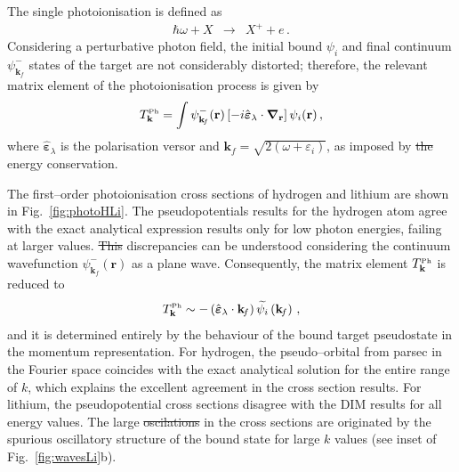 \documentclass[10pt]{article}
\providecommand{\DIFaddtex}[1]{{\protect\color{blue}\uwave{#1}}} %
\providecommand{\DIFdeltex}[1]{{\protect\color{red}\sout{#1}}}                      %
\providecommand{\DIFaddbegin}{} %
\providecommand{\DIFaddend}{} %
\providecommand{\DIFdelbegin}{} %
\providecommand{\DIFdelend}{} %
\providecommand{\DIFadd}[1]{\texorpdfstring{\DIFaddtex{#1}}{#1}} %
\providecommand{\DIFdel}[1]{\texorpdfstring{\DIFdeltex{#1}}{}} %
\begin{document}
The single photoionisation is defined as
\begin{eqnarray}
 \hbar\omega + X &\rightarrow& X^+ + e\,.
\end{eqnarray}
Considering a perturbative photon field, the initial bound $\psi_{i}$ 
and final continuum $\psi_{\mathbf{k}_{\!f}}^-$ states of the target are
not considerably distorted; therefore, the relevant matrix element of the 
photoionisation process is given by
\begin{equation}
 T_{\mathbf{k}}^{\mbox{\tiny Ph}} = \int{
 \psi_{\mathbf{k}_{\!f}}^-(\mathbf{r}) 
 \left[-i \hat{\boldsymbol{\varepsilon}}_\lambda \cdot 
 \boldsymbol{\nabla}_\mathbf{r}\right] 
 \psi_{i}(\mathbf{r})}\,,
\end{equation}
where $\hat{\boldsymbol{\varepsilon}}_\lambda$ is the polarisation 
versor and $\mathbf{k}_{\!f}=\sqrt{2(\omega+\varepsilon_i)}$, as imposed 
by \DIFdelbegin \DIFdel{the }\DIFdelend energy conservation.

The first--order photoionisation cross sections of hydrogen and 
lithium are shown in Fig.~\ref{fig:photoHLi}. The pseudopotentials 
results for the hydrogen atom agree with the exact analytical 
expression results only for low photon energies, failing at larger values. 
\DIFdelbegin \DIFdel{This }\DIFdelend \DIFaddbegin \DIFadd{These }\DIFaddend discrepancies can be understood considering the continuum 
wavefunction $\psi_{\mathbf{k}_{\!f}}^-(\mathbf{r})$ as a plane wave. 
Consequently, the matrix element $T_{\mathbf{k}}^{\mbox{\tiny Ph}}$ 
is reduced to
\begin{equation}
 T_{\mathbf{k}}^{\mbox{\tiny Ph}} \sim 
 -\left(\hat{\boldsymbol{\varepsilon}}_\lambda \cdot \mathbf{k}_{\!f} \right)
 \widetilde{\psi_i} \left(\mathbf{k}_{\!f}\right)\,,
\end{equation}
and it is determined entirely by the behaviour of the bound target 
pseudostate in the momentum representation. For hydrogen, the 
pseudo--orbital from {\sc parsec} in the Fourier space coincides with 
the exact 
analytical solution for the entire range of $k$, which explains the 
excellent agreement in the cross section results.
For lithium, the pseudopotential cross sections disagree with the DIM 
results for all energy values. The large \DIFdelbegin \DIFdel{oscilations }\DIFdelend \DIFaddbegin \DIFadd{oscillations }\DIFaddend in the cross sections
are originated by the spurious oscillatory structure of the bound state
for large  $k$ values (see inset of Fig.~\ref{fig:wavesLi}b).
\end{document}
